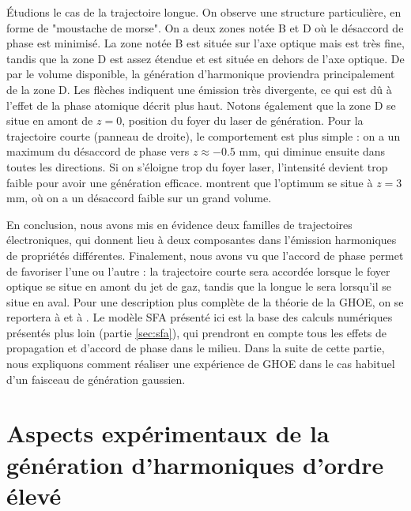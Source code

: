 \'Etudions le cas de la trajectoire longue. On observe une structure particulière, en forme de "moustache de morse". On a deux zones notée B et D où le désaccord de phase est minimisé. La zone notée B est située sur l'axe optique mais est très fine, tandis que la zone D est assez étendue et est située en dehors de l'axe optique. De par le volume disponible, la génération d'harmonique proviendra principalement de la zone D. Les flèches indiquent une émission très divergente, ce qui est dû à l'effet de la phase atomique décrit plus haut. Notons également que la zone D se situe en amont de $z=0$, position du foyer du laser de génération. Pour la trajectoire courte (panneau de droite), le comportement est plus simple : on a un maximum du désaccord de phase vers $z\approx-0.5$ mm, qui diminue ensuite dans toutes les directions. Si on s'éloigne trop du foyer laser, l'intensité devient trop faible pour avoir une génération efficace.  montrent que l'optimum se situe à $z=3$ mm, où on a un désaccord faible sur un grand volume. 

En conclusion, nous avons mis en évidence deux familles de trajectoires électroniques, qui donnent lieu à deux composantes dans l'émission harmoniques de propriétés différentes. Finalement, nous avons vu que l'accord de phase permet de favoriser l'une ou l'autre : la trajectoire courte sera accordée lorsque le foyer optique se situe en amont du jet de gaz, tandis que la longue le sera lorsqu'il se situe en aval. Pour une description plus complète de la théorie de la GHOE, on se reportera à  et à . Le modèle SFA présenté ici est la base des calculs numériques présentés plus loin (partie \ref{sec:sfa}), qui prendront en compte tous les effets de propagation et d'accord de phase dans le milieu. Dans la suite de cette partie, nous expliquons comment réaliser une expérience de GHOE dans le cas habituel d'un faisceau de génération gaussien.

\chapter{Aspects expérimentaux de la génération d'harmoniques d'ordre élevé}
\label{Sec:HHG_G}
